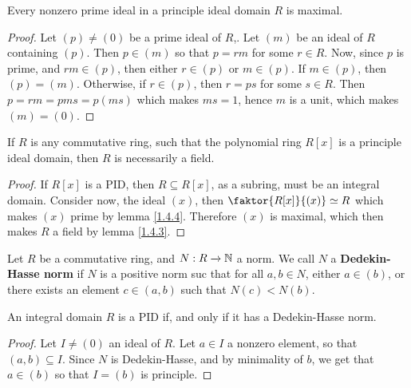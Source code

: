 \begin{lemma}\label{lemma_6.6.2}
  Every nonzero prime ideal in a principle ideal domain $R$ is maximal.
\end{lemma}
\begin{proof}
  Let $(p) \neq (0)$ be a prime ideal of $R$,. Let $(m)$ be an ideal of $R$
  containing $(p)$. Then $p \in (m)$ so that $p=rm$ for some  $r \in R$. Now,
  since $p$ is prime, and $rm \in (p)$, then either $r \in (p)$ or $m \in
  (p)$. If $m \in (p)$, then $(p)=(m)$. Otherwise, if $r \in (p)$, then $r=ps$
  for some  $s \in R$. Then  $p=rm=pms=p(ms)$ which makes $ms=1$, hence $m$ is
  a unit, which makes $(m)=(0)$.
\end{proof}
\begin{corollary}
  If $R$ is any commutative ring, such that the polynomial ring $R[x]$ is a
  principle ideal domain, then $R$ is necessarily a field.
\end{corollary}
\begin{proof}
  If $R[x]$ is a PID, then $R \subseteq R[x]$, as a subring, must be an
  integral domain. Consider now, the ideal $(x)$, then $\faktor{R[x]}{(x)}
  \simeq R$ which makes $(x)$ prime by lemma \ref{1.4.4}. Therefore $(x)$ is
  maximal, which then makes $R$ a field by lemma \ref{1.4.3}.
\end{proof}

\begin{definition}
  Let $R$ be a commutative ring, and  $N:R \xrightarrow{} \mathbb{N}$ a norm. We call
  $N$ a \textbf{Dedekin-Hasse norm} if $N$ is a positive norm suc that for
  all $a,b \in N$, either $a \in (b)$, or there exists an element $c \in
  (a,b)$ such that $N(c)<N(b)$.
\end{definition}

\begin{lemma}\label{lemma_6.6.3}
  An integral domain $R$ is a PID if, and only if it has a Dedekin-Hasse norm.
\end{lemma}
\begin{proof}
  Let $I \neq (0)$ an ideal of $R$. Let $a \in I$ a nonzero element, so that
  $(a,b) \subseteq I$. Since $N$ is Dedekin-Hasse, and by minimality of $b$,
  we get that $a \in (b)$ so that $I=(b)$ is principle.
\end{proof}

